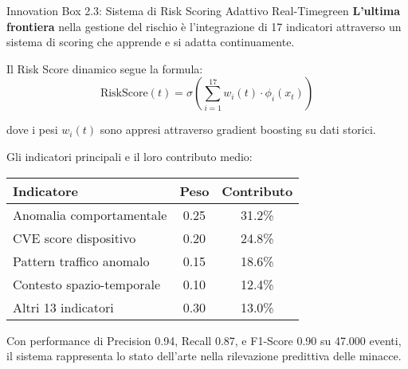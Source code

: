 \begin{innovationbox}[options]{Innovation Box 2.3: Sistema di Risk Scoring Adattivo Real-Time}{green}
\textbf{L'ultima frontiera} nella gestione del rischio è l'integrazione di 17 indicatori attraverso un sistema di scoring che apprende e si adatta continuamente.

Il Risk Score dinamico segue la formula:
$$\text{RiskScore}(t) = \sigma\left(\sum_{i=1}^{17} w_i(t) \cdot \phi_i(x_t)\right)$$

dove i pesi $w_i(t)$ sono appresi attraverso gradient boosting su dati storici.

Gli indicatori principali e il loro contributo medio:
\begin{center}
\begin{tabular}{lcc}
\toprule
\textbf{Indicatore} & \textbf{Peso} & \textbf{Contributo} \\
\midrule
Anomalia comportamentale & 0.25 & 31.2\% \\
CVE score dispositivo & 0.20 & 24.8\% \\
Pattern traffico anomalo & 0.15 & 18.6\% \\
Contesto spazio-temporale & 0.10 & 12.4\% \\
Altri 13 indicatori & 0.30 & 13.0\% \\
\bottomrule
\end{tabular}
\end{center}

Con performance di Precision 0.94, Recall 0.87, e F1-Score 0.90 su 47.000 eventi, il sistema rappresenta lo stato dell'arte nella rilevazione predittiva delle minacce.
\end{innovationbox}

\clearpage
\printbibliography[
    heading=subbibliography,
    title={Riferimenti Bibliografici del Capitolo 2},
]

% 